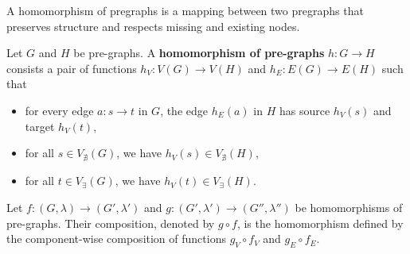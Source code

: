  A homomorphism of pregraphs is a mapping between two pregraphs that preserves structure and respects missing and existing nodes.
 \begin{definition}
    \label{def:pregraph:homomorphism}
    Let \( G \) and \( H \) be pre-graphs. A \textbf{homomorphism of pre-graphs} $h: G \to H$ consists a pair of functions $h_V: V(G) \to V(H) $ and $h_E: E(G) \to E(H)$ such that
    \begin{itemize}
        \item for every edge \( a \colon s \to t \) in \( G \), the edge \( h_E(a) \) in $H$ has source \( h_V(s) \) and target \( h_V(t) \),
        \item for all $s \in V_{\nexists}(G)$, we have $h_V(s) \in V_{\nexists}(H)$,
        \item for all $t \in V_\exists(G)$, we have $h_V(t) \in V_\exists(H)$.
    \end{itemize} 
\end{definition}

\begin{definition}[Composition]
    \label{def:pregraph:composition}
    Let $f: (G,\lambda) \to (G',\lambda')$ and $g: (G',\lambda') \to (G'',\lambda'')$ be homomorphisms of pre-graphs. Their composition, denoted by $g \circ f$, is the homomorphism defined by the component-wise composition of functions $g_V \circ f_V$ and $g_E \circ f_E$.
\end{definition}

